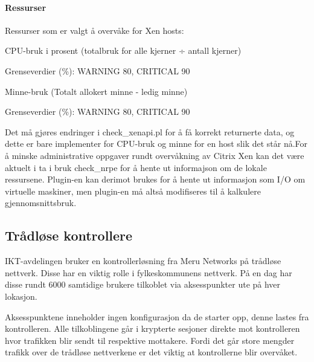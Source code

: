 \paragraph{Ressurser}
Ressurser som er valgt å overvåke for Xen hosts:
\begin{itemize*}
        \item CPU-bruk i prosent (totalbruk for alle kjerner ÷ antall kjerner)
        \begin{itemize*}
                \item Grenseverdier (\%): WARNING 80, CRITICAL 90
        \end{itemize*}
        \item Minne-bruk (Totalt allokert minne - ledig minne)
        \begin{itemize*}
                \item Grenseverdier (\%): WARNING 80, CRITICAL 90
        \end{itemize*}
\end{itemize*}

Det må gjøres endringer i check\_xenapi.pl for å få korrekt returnerte data, og dette er bare implementer for CPU-bruk og minne for en host slik det står nå.For å minske administrative oppgaver rundt overvåkning av Citrix Xen kan det være aktuelt i ta i bruk check\_nrpe for å hente ut informajson om de lokale ressursene. Plugin-en kan derimot brukes for å hente ut informasjon som I/O om virtuelle maskiner, men plugin-en må altså modifiseres til å kalkulere gjennomsnittsbruk.

\subsection{Trådløse kontrollere}
IKT-avdelingen bruker en kontrollerløsning fra Meru Networks på trådløse nettverk. Disse har en viktig rolle i fylkeskommunens nettverk. På en dag har disse rundt 6000 samtidige brukere tilkoblet via aksesspunkter ute på hver lokasjon.

Aksesspunktene inneholder ingen konfigurasjon da de starter opp, denne lastes fra kontrolleren. Alle tilkoblingene går i krypterte sesjoner direkte mot kontrolleren hvor trafikken blir sendt til respektive mottakere. Fordi det går store mengder trafikk over de trådløse nettverkene er det viktig at kontrollerne blir overvåket.

